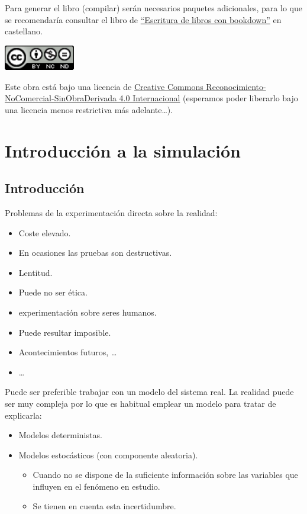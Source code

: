 \documentclass[]{book}
\theoremstyle{definition}
\theoremstyle{definition}
\theoremstyle{definition}
\theoremstyle{remark}
\begin{document}
Para generar el libro (compilar) serán necesarios paquetes adicionales,
para lo que se recomendaría consultar el libro de
\href{https://rubenfcasal.github.io/bookdown_intro}{``Escritura de
libros con bookdown''} en castellano.

\includegraphics[width=1.22in]{images/by-nc-nd-88x31}

Este obra está bajo una licencia de
\href{https://creativecommons.org/licenses/by-nc-nd/4.0/deed.es_ES}{Creative
Commons Reconocimiento-NoComercial-SinObraDerivada 4.0 Internacional}
(esperamos poder liberarlo bajo una licencia menos restrictiva más
adelante\ldots{}).

\chapter{Introducción a la
simulación}\label{introduccion-a-la-simulacion}

\section{Introducción}\label{introduccion}

Problemas de la experimentación directa sobre la realidad:

\begin{itemize}
\item
  Coste elevado.
\item
  En ocasiones las pruebas son destructivas.
\item
  Lentitud.
\item
  Puede no ser ética.
\item
  experimentación sobre seres humanos.
\item
  Puede resultar imposible.
\item
  Acontecimientos futuros, \ldots{}
\item
  \ldots{}
\end{itemize}

Puede ser preferible trabajar con un modelo del sistema real. La
realidad puede ser muy compleja por lo que es habitual emplear un modelo
para tratar de explicarla:

\begin{itemize}
\item
  Modelos deterministas.
\item
  Modelos estocásticos (con componente aleatoria).

  \begin{itemize}
  \item
    Cuando no se dispone de la suficiente información sobre las
    variables que influyen en el fenómeno en estudio.
  \item
    Se tienen en cuenta esta incertidumbre.
  \end{itemize}
\end{itemize}
\end{document}
